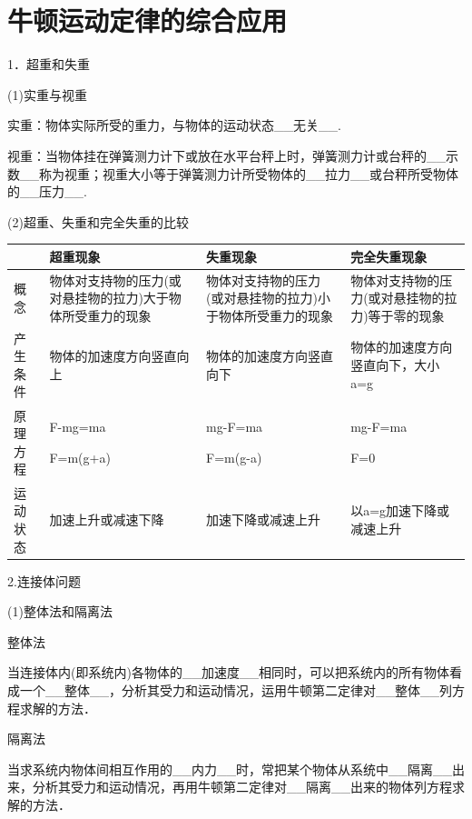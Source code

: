 \section{牛顿运动定律的综合应用}


1．超重和失重

(1)实重与视重

实重：物体实际所受的重力，与物体的运动状态\_\_无关\_\_.

视重：当物体挂在弹簧测力计下或放在水平台秤上时，弹簧测力计或台秤的\_\_示数\_\_称为视重；视重大小等于弹簧测力计所受物体的\_\_拉力\_\_或台秤所受物体的\_\_压力\_\_.

(2)超重、失重和完全失重的比较

\begin{longtable}[]{@{}m{1.6cm}m{4.7cm}m{4.7cm}m{3.5cm}@{}}
\toprule
& 超重现象 & 失重现象 & 完全失重现象\tabularnewline
\midrule
\endhead
概念 &
物体对支持物的压力(或对悬挂物的拉力)大于物体所受重力的现象 &
物体对支持物的压力(或对悬挂物的拉力)小于物体所受重力的现象 &
物体对支持物的压力(或对悬挂物的拉力)等于零的现象\tabularnewline
产生条件& 物体的加速度方向竖直向上 &物体的加速度方向竖直向下&物体的加速度方向竖直向下，大小a=g　\tabularnewline
原理方程& \begin{minipage}[t]{0.22\columnwidth}\raggedright
F-mg=ma

F=m(g+a)\strut
\end{minipage} & \begin{minipage}[t]{0.22\columnwidth}\raggedright
mg-F=ma

F=m(g-a)\strut
\end{minipage} & \begin{minipage}[t]{0.22\columnwidth}\raggedright
mg-F=ma

F=0\strut
\end{minipage}\tabularnewline
运动状态 & 加速上升或减速下降 &
加速下降或减速上升 &
以a=g加速下降或减速上升\tabularnewline
\bottomrule
\end{longtable}

2.连接体问题

(1)整体法和隔离法

整体法

当连接体内(即系统内)各物体的\_\_加速度\_\_相同时，可以把系统内的所有物体看成一个\_\_整体\_\_，分析其受力和运动情况，运用牛顿第二定律对\_\_整体\_\_列方程求解的方法．

隔离法

当求系统内物体间相互作用的\_\_内力\_\_时，常把某个物体从系统中\_\_隔离\_\_出来，分析其受力和运动情况，再用牛顿第二定律对\_\_隔离\_\_出来的物体列方程求解的方法．

